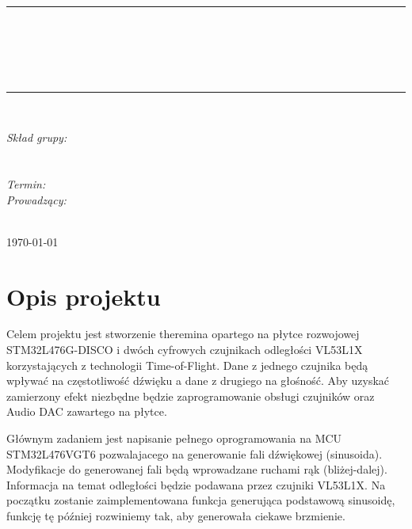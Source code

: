 \documentclass[10pt, a4paper]{article}
\begin{document}
\def\tablename{Tabela}	%

\begin{titlepage}
	\begin{center}
		\textsc{\LARGE \formakursu}\\[1cm]		
		\textsc{\Large \kurs}\\[0.5cm]		
		\rule{\textwidth}{0.08cm}\\[0.4cm]
		{\huge \bfseries \doctype}\\[1cm]
		{\huge \bfseries \projectname}\\[0.5cm]
		{\huge \bfseries \acronim}\\[0.4cm]
		\rule{\textwidth}{0.08cm}\\[1cm]
		
		\begin{flushright} \large
		\emph{Skład grupy:}\\
		\osobaA\\
		\osobaB\\[0.4cm]
		
		\emph{Termin: }\termin\\[0.4cm]

		\emph{Prowadzący:} \\
		\prowadzacy \\
		
		\end{flushright}
		
		\vfill
		
		{\large \today}
	\end{center}	
\end{titlepage}

\newpage
\tableofcontents
\newpage

\section{Opis projektu}
\label{sec:OpisProjektu}

Celem projektu jest stworzenie theremina opartego na płytce rozwojowej STM32L476G-DISCO i dwóch cyfrowych czujnikach odległości VL53L1X korzystających z technologii Time-of-Flight. Dane z jednego czujnika będą wpływać na częstotliwość dźwięku a dane z drugiego na głośność. Aby uzyskać zamierzony efekt niezbędne będzie zaprogramowanie obsługi czujników oraz Audio DAC zawartego na płytce. 

Głównym zadaniem jest napisanie pełnego oprogramowania na MCU STM32L476VGT6 pozwalajacego na generowanie fali dźwiękowej (sinusoida). Modyfikacje do generowanej fali będą wprowadzane ruchami rąk (bliżej-dalej). Informacja na temat odległości będzie podawana przez czujniki VL53L1X. Na początku zostanie zaimplementowana funkcja generująca podstawową sinusoidę, funkcję tę później rozwiniemy tak, aby generowała ciekawe brzmienie.
\end{document}
